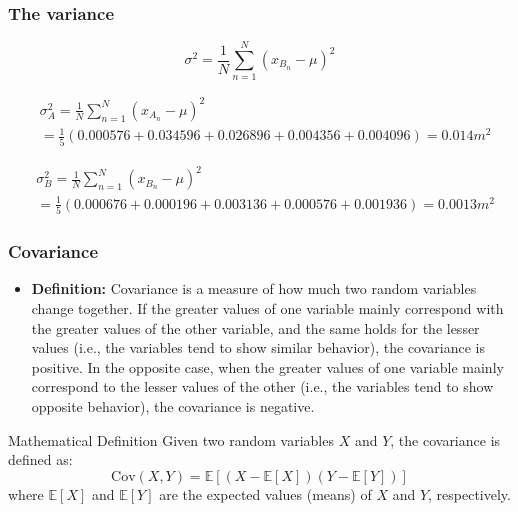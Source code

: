 \documentclass{beamer}
\begin{document}
\begin{frame}
    \frametitle{The variance}
    
    \begin{equation*}
        \sigma^{2} = \frac{1}{N} \sum _{n=1}^{N} \left( x_{\scriptscriptstyle \!B_{n}} -  \mu  \right) ^{2}
    \end{equation*}

    \vspace{5mm}
    \footnotesize

    \begin{align*}
        &\sigma_{\scriptscriptstyle \!A}^{2} = \frac{1}{N} \sum _{n=1}^{N} \left( x_{\scriptscriptstyle \!A_{n}} -  \mu  \right) ^{2}\\ &= \frac{1}{5} \left( 0.000576+ 0.034596+ 0.026896+ 0.004356+ 0.004096 \right) = 0.014m^{2}
    \end{align*}
    
    \vspace{3mm}
    
    \begin{align*}
       &\sigma_{\scriptscriptstyle \!B}^{2} = \frac{1}{N} \sum _{n=1}^{N} \left( x_{\scriptscriptstyle \!B_{n}} -  \mu  \right) ^{2}\\ & = \frac{1}{5} \left( 0.000676+ 0.000196+ 0.003136+ 0.000576+ 0.001936 \right) = 0.0013m^{2}
    \end{align*}
   
\end{frame}

\begin{frame}
    \frametitle{Covariance}
    \footnotesize

    \begin{itemize}
        \item \textbf{Definition:}
        Covariance is a measure of how much two random variables change together. If the greater values of one variable mainly correspond with the greater values of the other variable, and the same holds for the lesser values (i.e., the variables tend to show similar behavior), the covariance is positive. In the opposite case, when the greater values of one variable mainly correspond to the lesser values of the other (i.e., the variables tend to show opposite behavior), the covariance is negative.
    \end{itemize}

    \begin{block}{Mathematical Definition}
        Given two random variables \(X\) and \(Y\), the covariance is defined as:
        \[
        \text{Cov}(X, Y) = \mathbb{E}[(X - \mathbb{E}[X])(Y - \mathbb{E}[Y])]
        \]
        where \(\mathbb{E}[X]\) and \(\mathbb{E}[Y]\) are the expected values (means) of \(X\) and \(Y\), respectively.
    \end{block}
\end{frame}
\end{document}
